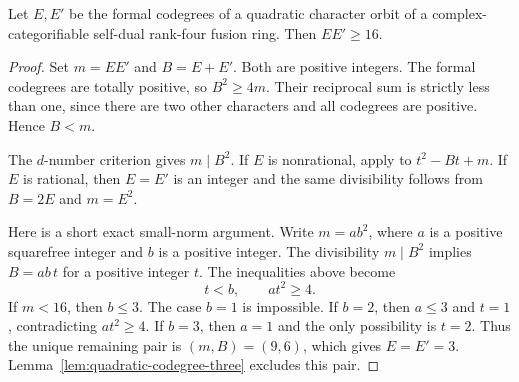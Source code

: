 \begin{lemma}\label{lem:small-quadratic-codegree-norm}
Let $E,E'$ be the formal codegrees of a quadratic character orbit of a
complex-categorifiable self-dual rank-four fusion ring. Then
$EE'\geq16$.
\end{lemma}
\begin{proof}
Set $m=EE'$ and $B=E+E'$. Both are positive integers. The formal
codegrees are totally positive, so $B^2\geq4m$. Their reciprocal sum
is strictly less than one, since there are two other characters and
all codegrees are positive. Hence $B<m$.

The $d$-number criterion gives $m\mid B^2$. If $E$ is nonrational,
apply \cite[Proposition~\ref{B-prop:standard}]{Finite} to $t^2-Bt+m$. If $E$ is
rational, then $E=E'$ is an integer and the same divisibility follows
from $B=2E$ and $m=E^2$.

Here is a short exact small-norm argument. Write $m=ab^2$, where $a$
is a positive squarefree integer and $b$ is a positive integer. The
divisibility $m\mid B^2$ implies $B=ab\,t$ for a positive integer
$t$. The inequalities above become
\[
 t<b,\qquad at^2\geq4.
\]
If $m<16$, then $b\leq3$. The case $b=1$ is impossible. If $b=2$,
then $a\leq3$ and $t=1$, contradicting $at^2\geq4$. If $b=3$,
then $a=1$ and the only possibility is $t=2$. Thus the unique
remaining pair is $(m,B)=(9,6)$, which gives $E=E'=3$.
Lemma~\ref{lem:quadratic-codegree-three} excludes this pair.
\end{proof}

